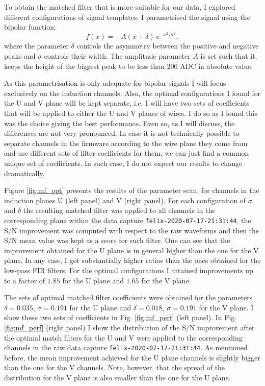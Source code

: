 To obtain the matched filter that is more suitable for our data, I explored different configurations of signal templates. I parametrised the signal using the bipolar function:
\begin{equation}\label{2.4.13}
	f(x) = -A (x + \delta) \ \mathrm{e}^{-x^{2}/\sigma^{2}},
\end{equation}
where the parameter $\delta$ controls the asymmetry between the positive and negative peaks and $\sigma$ controls their width. The amplitude parameter $A$ is set such that it keeps the height of the biggest peak to be less than $200$ ADC in absolute value.

As this parametrisation is only adequate for bipolar signals I will focus exclusively on the induction channels. Also, the optimal configurations I found for the U and V plane will be kept separate, i.e. I will have two sets of coefficients that will be applied to either the U and V planes of wires. I do so as I found this was the choice giving the best performance. Even so, as I will discuss, the differences are not very pronounced. In case it is not technically possible to separate channels in the firmware according to the wire plane they come from and use different sets of filter coefficients for them, we can just find a common unique set of coefficients. In such case, I do not expect our results to change dramatically.

Figure \ref{fig:mf_opt} presents the results of the parameter scan, for channels in the induction planes U (left panel) and V (right panel). For each configuration of $\sigma$ and $\delta$ the resulting matched filter was applied to all channels in the corresponding plane within the data capture \texttt{felix-2020-07-17-21:31:44}, the S/N improvement was computed with respect to the raw waveforms and then the S/N mean value was kept as a score for such filter. One can see that the improvement obtained for the U plane is in general higher than the one for the V plane. In any case, I got substantially higher ratios than the ones obtained for the low-pass FIR filters. For the optimal configurations I attained improvements up to a factor of $1.85$ for the U plane and $1.65$ for the V plane.

The sets of optimal matched filter coefficients were obtained for the parameters $\delta = 0.035$, $\sigma = 0.191$ for the U plane and $\delta = 0.018$, $\sigma = 0.191$ for the V plane. I show these two sets of coefficients in Fig. \ref{fig:mf_perf} (left panel). In Fig. \ref{fig:mf_perf} (right panel) I show the distribution of the S/N improvement after the optimal match filters for the U and V were applied to the corresponding channels in the raw data capture \texttt{felix-2020-07-17-21:31:44}. As mentioned before, the mean improvement achieved for the U plane channels is slightly bigger than the one for the V channels. Note, however, that the spread of the distribution for the V plane is also smaller than the one for the U plane.

